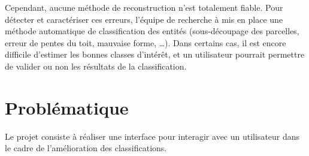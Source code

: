 \newpage Cependant, aucune méthode de reconstruction n’est totalement fiable. Pour détecter et caractériser ces erreurs, l’équipe de recherche à mis en place une méthode automatique de classification des entités (sous-découpage des parcelles, erreur de pentes du toit, mauvaise forme, …). Dans certains cas, il est encore difficile d’estimer les bonnes classes d’intérêt, et un utilisateur pourrait permettre de valider ou non les résultats de la classification. \newline 

\section{Problématique}

Le projet consiste à réaliser une interface pour interagir avec un utilisateur dans le cadre de l'amélioration des classifications. 
